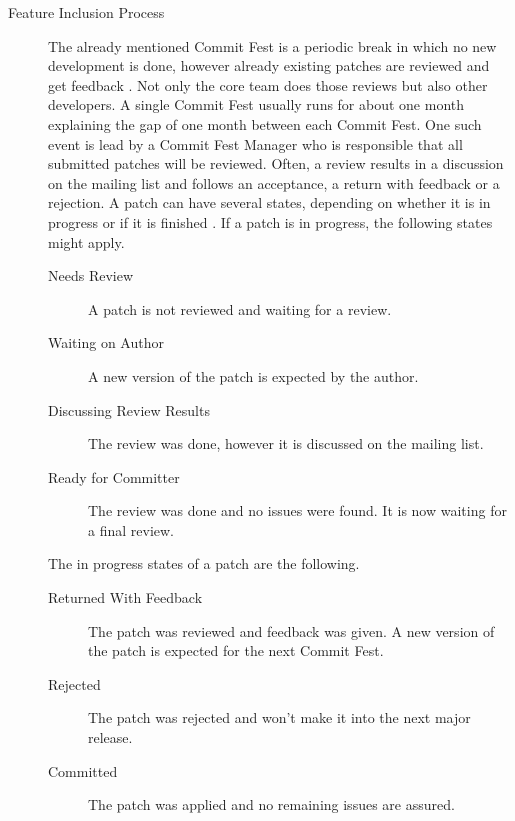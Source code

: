 \begin{description}
\begin{description}
    \item[Feature Inclusion Process] The already mentioned Commit Fest is a
      periodic break in which no new development is done, however already
      existing patches are reviewed and get feedback
      \cite{PostgreSQLCommitFest}. Not only the core team does those reviews
      but also other developers. A single Commit Fest usually runs for about
      one month explaining the gap of one month between each Commit Fest. One
      such event is lead by a Commit Fest Manager who is responsible that all
      submitted patches will be reviewed. Often, a review results in a
      discussion on the mailing list and follows an acceptance, a return with
      feedback or a rejection. A patch can have several states, depending on
      whether it is in progress or if it is finished
      \cite{PostgreSQLCommitFestRunning}. If a patch is in progress, the
      following states might apply.

      \begin{description}

        \item[Needs Review] A patch is not reviewed and waiting for a review.

        \item[Waiting on Author] A new version of the patch is expected by the
          author.

        \item[Discussing Review Results] The review was done, however it is
          discussed on the mailing list.

        \item[Ready for Committer] The review was done and no issues were
          found. It is now waiting for a final review.

      \end{description}

      The in progress states of a patch are the following.

      \begin{description}

        \item[Returned With Feedback] The patch was reviewed and feedback was
          given. A new version of the patch is expected for the next Commit Fest.

        \item[Rejected] The patch was rejected and won't make it into the next
          major release.

        \item[Committed] The patch was applied and no remaining issues are
          assured.

      \end{description}

  \end{description}

\end{description}

